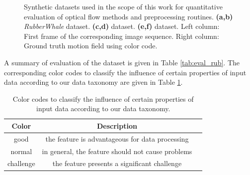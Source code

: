 \begin{figure}[!t]
  \centerline{
    \mbox{}
    \mbox{}
  }
  
  \vspace{3pt}
  \centerline{
    \mbox{}
    \mbox{}
  } 
  \vspace{3pt}
   \centerline{
    \mbox{}
    \mbox{}
  } 
  
  \caption[]{Synthetic datasets used in the scope of this work for quantitative evaluation of optical flow methods and preprocessing routines. \textbf{(a,b)}  \textit{RubberWhale} dataset. \textbf{(c,d)} \hyd dataset. \textbf{(e,f)}  \mar dataset. Left column: First frame of the corresponding image sequence. Right column:  Ground truth motion field using color code.}
  \label{fig:gt_images}
\end{figure}
A summary of evaluation of the \rub dataset is given in Table \ref{tab:eval_rub}. The corresponding color codes to classify the influence of certain properties of input data according to our data taxonomy are given in Table \ref{tab:color_codes}.

\begin{table}[ht] \footnotesize
	\centering
	\caption{Color codes to classify the influence of certain properties of input data according to our data taxonomy.}
	\begin{tabular}{ccc}
		\toprule
		\textbf{Color} & \textbf{Description}  \\ 
		\midrule
		\cellcolor{good} good     	    & the feature is advantageous for data processing \\
		\cellcolor{norm} normal     	& in general, the feature should not cause problems  \\
		\cellcolor{bad} challenge     	    & the feature presents a significant challenge \\   
		\bottomrule
	\end{tabular}
	\label{tab:color_codes}%
\end{table}

